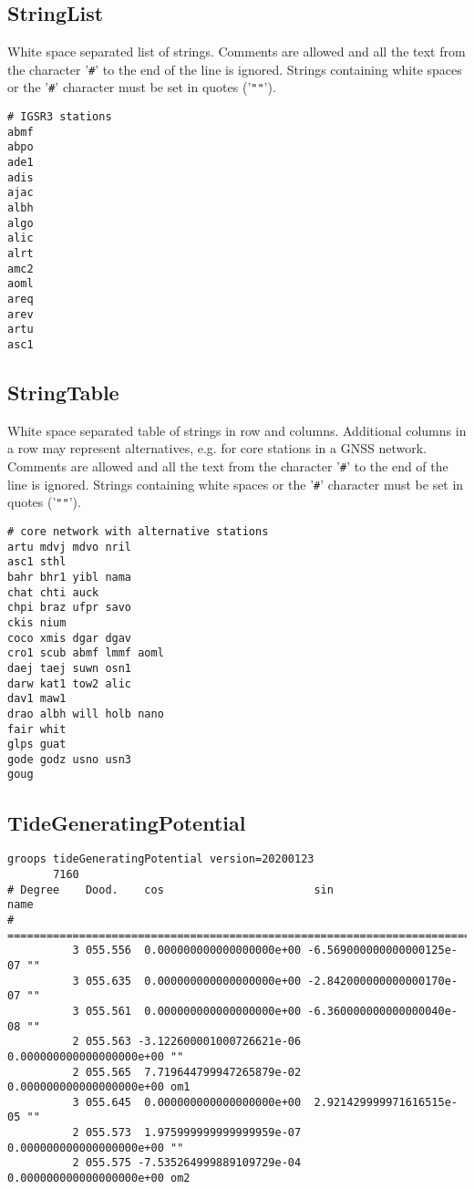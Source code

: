\subsection{StringList}\label{general.fileFormat:stringList}
White space separated list of strings.
Comments are allowed and all the text from the character '\verb|#|' to the end of the line is ignored.
Strings containing white spaces or the '\verb|#|' character must be set in quotes ('\verb|""|').

\begin{verbatim}
# IGSR3 stations
abmf
abpo
ade1
adis
ajac
albh
algo
alic
alrt
amc2
aoml
areq
arev
artu
asc1
\end{verbatim}


\subsection{StringTable}\label{general.fileFormat:stringTable}
White space separated table of strings in row and columns.
Additional columns in a row may represent alternatives, e.g. for core stations in a GNSS network.
Comments are allowed and all the text from the character '\verb|#|' to the end of the line is ignored.
Strings containing white spaces or the '\verb|#|' character must be set in quotes  ('\verb|""|').

\begin{verbatim}
# core network with alternative stations
artu mdvj mdvo nril
asc1 sthl
bahr bhr1 yibl nama
chat chti auck
chpi braz ufpr savo
ckis nium
coco xmis dgar dgav
cro1 scub abmf lmmf aoml
daej taej suwn osn1
darw kat1 tow2 alic
dav1 maw1
drao albh will holb nano
fair whit
glps guat
gode godz usno usn3
goug
\end{verbatim}


\subsection{TideGeneratingPotential}\label{general.fileFormat:tideGeneratingPotential}

\begin{verbatim}
groops tideGeneratingPotential version=20200123
       7160
# Degree    Dood.    cos                       sin                      name
# ==========================================================================
          3 055.556  0.000000000000000000e+00 -6.569000000000000125e-07 ""
          3 055.635  0.000000000000000000e+00 -2.842000000000000170e-07 ""
          3 055.561  0.000000000000000000e+00 -6.360000000000000040e-08 ""
          2 055.563 -3.122600001000726621e-06  0.000000000000000000e+00 ""
          2 055.565  7.719644799947265879e-02  0.000000000000000000e+00 om1
          3 055.645  0.000000000000000000e+00  2.921429999971616515e-05 ""
          2 055.573  1.975999999999999959e-07  0.000000000000000000e+00 ""
          2 055.575 -7.535264999889109729e-04  0.000000000000000000e+00 om2
\end{verbatim}




